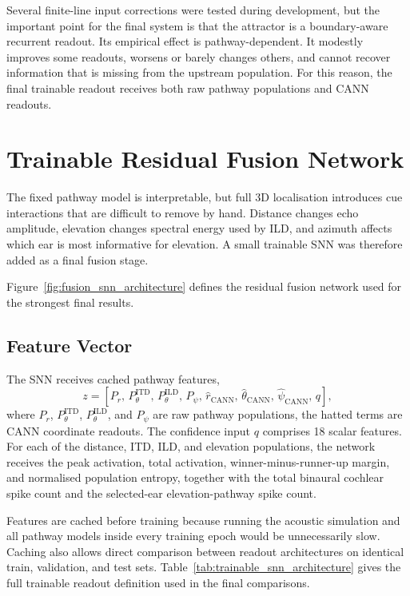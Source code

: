 Several finite-line input corrections were tested during development, but the important point for the final system is that the attractor is a boundary-aware recurrent readout. Its empirical effect is pathway-dependent. It modestly improves some readouts, worsens or barely changes others, and cannot recover information that is missing from the upstream population. For this reason, the final trainable readout receives both raw pathway populations and CANN readouts.

\section{Trainable Residual Fusion Network}

The fixed pathway model is interpretable, but full 3D localisation introduces cue interactions that are difficult to remove by hand. Distance changes echo amplitude, elevation changes spectral energy used by ILD, and azimuth affects which ear is most informative for elevation. A small trainable SNN was therefore added as a final fusion stage.



Figure~\ref{fig:fusion_snn_architecture} defines the residual fusion network used for the strongest final results.

\subsection{Feature Vector}

The SNN receives cached pathway features,
\begin{equation}
    z =
    \left[
    P_r,\,
    P^{\mathrm{ITD}}_{\theta},\,
    P^{\mathrm{ILD}}_{\theta},\,
    P_{\psi},\,
    \hat{r}_{\mathrm{CANN}},\,
    \hat{\theta}_{\mathrm{CANN}},\,
    \hat{\psi}_{\mathrm{CANN}},\,
    q
    \right],
\end{equation}
where $P_r$, $P^{\mathrm{ITD}}_{\theta}$, $P^{\mathrm{ILD}}_{\theta}$, and $P_{\psi}$ are raw pathway populations, the hatted terms are CANN coordinate readouts. The confidence input $q$ comprises 18 scalar features. For each of the distance, ITD, ILD, and elevation populations, the network receives the peak activation, total activation, winner-minus-runner-up margin, and normalised population entropy, together with the total binaural cochlear spike count and the selected-ear elevation-pathway spike count.

Features are cached before training because running the acoustic simulation and all pathway models inside every training epoch would be unnecessarily slow. Caching also allows direct comparison between readout architectures on identical train, validation, and test sets. Table~\ref{tab:trainable_snn_architecture} gives the full trainable readout definition used in the final comparisons.

